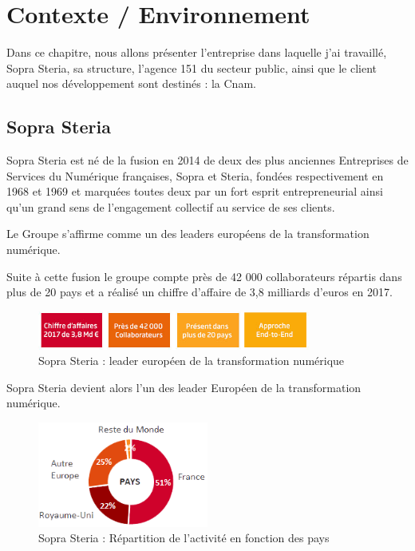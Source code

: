 \chapter{Contexte / Environnement}
\label{chap:premierchapitre}

Dans ce chapitre, nous allons présenter l'entreprise dans laquelle j'ai travaillé, Sopra Steria, sa structure, l'agence 151 du secteur public, ainsi que le client auquel nos développement sont destinés : la Cnam.

\section{Sopra Steria}

Sopra Steria est né de la fusion en 2014 de deux des plus anciennes Entreprises de Services du Numérique françaises, Sopra et Steria, fondées respectivement en 1968 et 1969 et marquées toutes deux par un fort esprit entrepreneurial ainsi qu'un grand sens de l’engagement collectif au service de ses clients.

Le Groupe s'affirme comme un des leaders européens de la transformation numérique.

Suite à cette fusion le groupe compte près de 42 000 collaborateurs répartis dans plus de 20 pays et a réalisé un chiffre d’affaire de 3,8 milliards d’euros en 2017.

\begin{figure}[!h]
\centering
\includegraphics[width=0.8\textwidth]{images/chiffres_cles2017.jpg}
\caption{Sopra Steria : leader européen de la transformation numérique}
\end{figure}


Sopra Steria devient alors l'un des leader Européen de la transformation numérique.

\begin{figure}[!h]
\centering
\includegraphics[width=0.5\textwidth]{images/payssoprasteria.png}
\caption{Sopra Steria : Répartition de l'activité en fonction des pays}
\end{figure}

